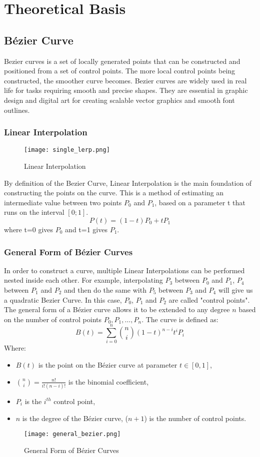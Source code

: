 \section{Theoretical Basis}
\subsection{Bézier Curve}
Bezier curves is a set of locally generated points that can be constructed and positioned from a set of control points.
The more local control points being constructed, the smoother curve becomes.
Bezier curves are widely used in real life for tasks requiring smooth and precise shapes.
They are essential in graphic design and digital art for creating scalable vector graphics and smooth font outlines.

\subsubsection{Linear Interpolation}

\begin{wrapfigure}{H}{0.4\textwidth}
  \centering
  \addtolength{\belowcaptionskip}{-4.0ex}
  \texttt{[image: single\_lerp.png]}
  \caption{Linear Interpolation}
\end{wrapfigure}
By definition of the Bezier Curve, Linear Interpolation is the main foundation of constructing the points on the curve.
This is a method of estimating an intermediate value between two points $P_0$ and $P_1$, based on a parameter t that runs on the interval $[0;1]$.
$$P(t)=(1-t)P_0+tP_1$$
where t=0 gives $P_0$ and t=1 gives $P_1$.

\subsubsection{General Form of Bézier Curves}
In order to construct a curve, multiple Linear Interpolations can be performed nested inside each other.
For example, interpolating $P_3$ between $P_0$ and $P_1$, $P_4$ between $P_1$ and $P_2$ and then do the same with $P_5$ between $P_3$ and $P_4$ will give us a quadratic Bezier Curve.
In this case, $P_0$, $P_1$ and $P_2$ are called "control points".
The general form of a Bézier curve allows it to be extended to any degree $n$ based on the number of control points $P_0, P_1, \ldots, P_n$. The curve is defined as:
$$B(t) = \sum_{i=0}^{n} \binom{n}{i} (1 - t)^{n-i} t^i P_i$$
Where:
\begin{itemize}
  \item $B(t)$ is the point on the Bézier curve at parameter $t \in [0, 1]$,
  \item $\binom{n}{i} = \frac{n!}{i!(n-i)!}$ is the binomial coefficient,
  \item $P_i$ is the $i^{th}$ control point,
  \item $n$ is the degree of the Bézier curve, ($n+1$) is the number of control points.
\end{itemize}
\begin{figure}[h]
  \centering
  \texttt{[image: general\_bezier.png]}
  \caption{General Form of Bézier Curves}
\end{figure}

